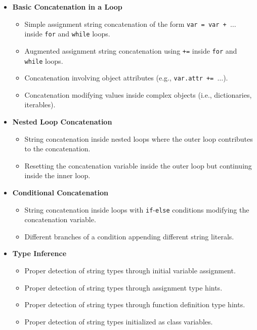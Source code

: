 \documentclass[12pt, titlepage]{article}
\begin{document}
  \begin{itemize}
    \item \textbf{Basic Concatenation in a Loop}
      \begin{itemize}
        \item Simple assignment string concatenation of the form
          \texttt{var = var + \( \ldots \)} inside \texttt{for} and
          \texttt{while} loops.
        \item Augmented assignment string concatenation using
          \texttt{+=} inside \texttt{for} and \texttt{while} loops.
        \item Concatenation involving object attributes (e.g.,
          \texttt{var.attr += \( \ldots \)}).
        \item Concatenation modifying values inside complex objects
          (i.e., dictionaries, iterables).
      \end{itemize}

    \item \textbf{Nested Loop Concatenation}
      \begin{itemize}
        \item String concatenation inside nested loops where the
          outer loop contributes to the concatenation.
        \item Resetting the concatenation variable inside the outer
          loop but continuing inside the inner loop.
      \end{itemize}

    \item \textbf{Conditional Concatenation}
      \begin{itemize}
        \item String concatenation inside loops with
          \texttt{if}-\texttt{else} conditions modifying the
          concatenation variable.
        \item Different branches of a condition appending different
          string literals.
      \end{itemize}

    \item \textbf{Type Inference}
      \begin{itemize}
        \item Proper detection of string types through initial
          variable assignment.
        \item Proper detection of string types through assignment type hints.
        \item Proper detection of string types through function
          definition type hints.
        \item Proper detection of string types initialized as class variables.
      \end{itemize}


\end{itemize}
\end{document}
